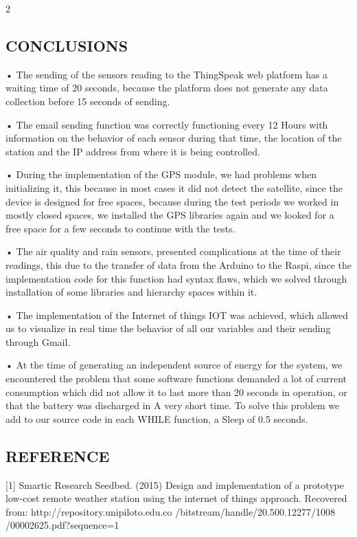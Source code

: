 \documentclass{article}
\begin{document}
\begin{multicols} {2}
\begin{center}
\section{CONCLUSIONS}
\end{center}

• The sending of the sensors reading to the ThingSpeak web platform has a waiting time of 20 seconds, because the platform does not generate any data collection before 15 seconds of sending.

• The email sending function was correctly functioning every 12 Hours with information on the behavior of each sensor during that time, the location of the station and the IP address from where it is being controlled.

• During the implementation of the GPS module, we had problems when initializing it, this because in most cases it did not detect the satellite, since the device is designed for free spaces, because during the test periods we worked in mostly closed spaces, we installed the GPS libraries again and we looked for a free space for a few seconds to continue with the tests.

• The air quality and rain sensors, presented complications at the time of their readings, this due to the transfer of data from the Arduino to the Raspi, since the implementation code for this function had syntax flaws, which we solved through installation of some libraries and hierarchy spaces within it.

• The implementation of the Internet of things IOT was achieved, which allowed us to visualize in real time the behavior of all our variables and their sending through Gmail.

• At the time of generating an independent source of energy for the system, we encountered the problem that some software functions demanded a lot of current consumption which did not allow it to last more than 20 seconds in operation, or that the battery was discharged in A very short time. To solve this problem we add to our source code in each WHILE function, a Sleep of 0.5 seconds.

\begin{center}
\section{REFERENCE}
\end{center}


[1] Smartic Research Seedbed. (2015) Design and implementation of a prototype low-cost remote weather station using the internet of things approach. Recovered from: http://repository.unipiloto.edu.co
/bitstream/handle/20.500.12277/1008
/00002625.pdf?sequence=1


\end{multicols}
\end{document}
